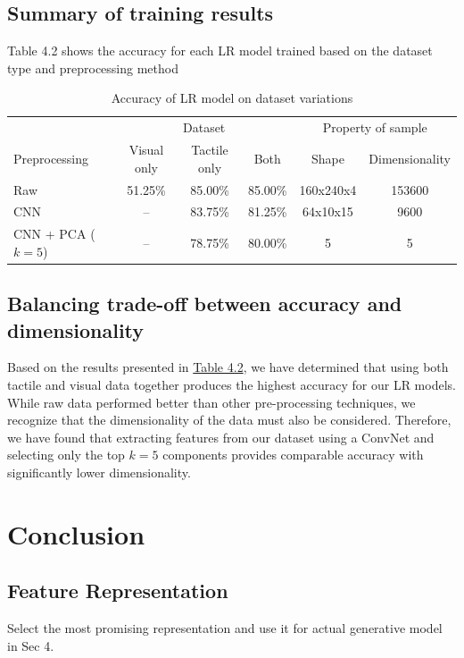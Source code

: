 \documentclass[11pt, a4paper]{report}
\theoremstyle{definition}
\begin{document}
\subsection{Summary of training results}
\label{sec:4.5.1}
Table 4.2 shows the accuracy for each LR model trained based on the dataset type and preprocessing method
\begin{table}[H]
    \centering
    \small
    \begin{tabular}{lccccc}
        \toprule
        & \multicolumn{3}{c}{Dataset} & \multicolumn{2}{c}{Property of sample} \\
        \cmidrule{2-4}\cmidrule{5-6}
        Preprocessing & Visual only & Tactile only & Both & Shape & Dimensionality \\
        \midrule
        Raw & 51.25\% & 85.00\% & 85.00\% & 160x240x4 & 153600 \\
        CNN & -- & 83.75\% & 81.25\% & 64x10x15  & 9600 \\
        CNN + PCA ($k=5$) & -- & 78.75\% & 80.00\% & 5 & 5\\
        \bottomrule
    \end{tabular}
    \caption{Accuracy of LR model on dataset variations}
    \label{tbl:4.2}
\end{table}


\subsection{Balancing trade-off between accuracy and dimensionality}
\label{sec:4.5.2}
Based on the results presented in \hyperref[tbl:4.2]{Table 4.2}, we have determined that using both tactile and visual data together produces the highest accuracy for our LR models. While raw data performed better than other pre-processing techniques, we recognize that the dimensionality of the data must also be considered. Therefore, we have found that extracting features from our dataset using a ConvNet and selecting only the top $k=5$ components provides comparable accuracy with significantly lower dimensionality.


\section{Conclusion}
\label{sec:4.6}


\subsection{Feature Representation}
\label{sec:4.6.1}
Select the most promising representation and use it for actual generative model in Sec 4.
\end{document}
